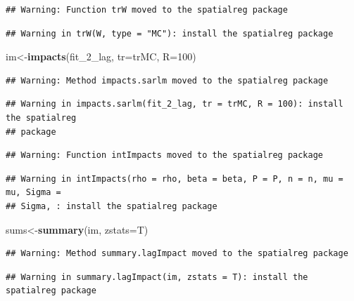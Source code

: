 \documentclass[]{book}
\newenvironment{Shaded}{\begin{snugshade}}{\end{snugshade}}
\newcommand{\DataTypeTok}[1]{\textcolor[rgb]{0.13,0.29,0.53}{#1}}
\newcommand{\DecValTok}[1]{\textcolor[rgb]{0.00,0.00,0.81}{#1}}
\newcommand{\KeywordTok}[1]{\textcolor[rgb]{0.13,0.29,0.53}{\textbf{#1}}}
\newcommand{\NormalTok}[1]{#1}
\begin{document}
\begin{verbatim}
## Warning: Function trW moved to the spatialreg package
\end{verbatim}

\begin{verbatim}
## Warning in trW(W, type = "MC"): install the spatialreg package
\end{verbatim}

\begin{Shaded}
\begin{Highlighting}[]
\NormalTok{im<-}\KeywordTok{impacts}\NormalTok{(fit_}\DecValTok{2}\NormalTok{_lag, }\DataTypeTok{tr=}\NormalTok{trMC, }\DataTypeTok{R=}\DecValTok{100}\NormalTok{)}
\end{Highlighting}
\end{Shaded}

\begin{verbatim}
## Warning: Method impacts.sarlm moved to the spatialreg package
\end{verbatim}

\begin{verbatim}
## Warning in impacts.sarlm(fit_2_lag, tr = trMC, R = 100): install the spatialreg
## package
\end{verbatim}

\begin{verbatim}
## Warning: Function intImpacts moved to the spatialreg package
\end{verbatim}

\begin{verbatim}
## Warning in intImpacts(rho = rho, beta = beta, P = P, n = n, mu = mu, Sigma =
## Sigma, : install the spatialreg package
\end{verbatim}

\begin{Shaded}
\begin{Highlighting}[]
\NormalTok{sums<-}\KeywordTok{summary}\NormalTok{(im,  }\DataTypeTok{zstats=}\NormalTok{T)}
\end{Highlighting}
\end{Shaded}

\begin{verbatim}
## Warning: Method summary.lagImpact moved to the spatialreg package
\end{verbatim}

\begin{verbatim}
## Warning in summary.lagImpact(im, zstats = T): install the spatialreg package
\end{verbatim}
\end{document}
